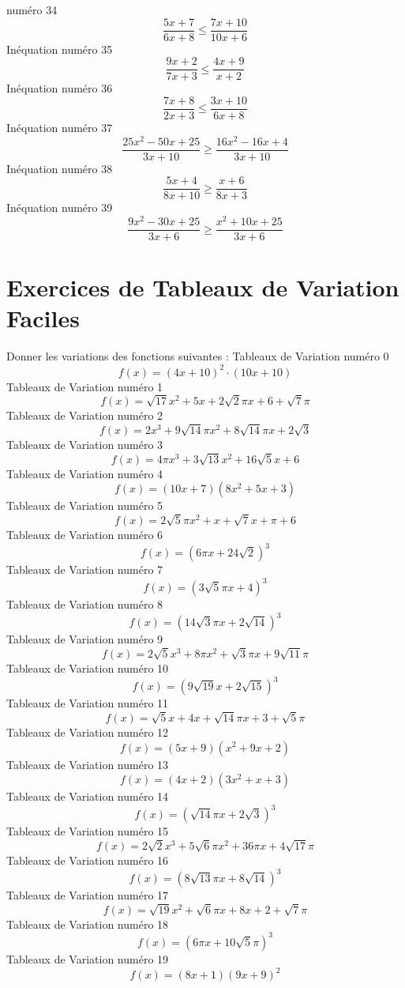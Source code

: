 \documentclass{article}
\begin{document}
num\'ero 34 \[\frac{5 x + 7}{6 x + 8} \leq \frac{7 x + 10}{10 x + 6}\]In\'equation num\'ero 35 \[\frac{9 x + 2}{7 x + 3} \leq \frac{4 x + 9}{x + 2}\]In\'equation num\'ero 36 \[\frac{7 x + 8}{2 x + 3} \leq \frac{3 x + 10}{6 x + 8}\]In\'equation num\'ero 37 \[\frac{25 x^{2} - 50 x + 25}{3 x + 10} \geq \frac{16 x^{2} - 16 x + 4}{3 x + 10}\]In\'equation num\'ero 38 \[\frac{5 x + 4}{8 x + 10} \geq \frac{x + 6}{8 x + 3}\]In\'equation num\'ero 39 \[\frac{9 x^{2} - 30 x + 25}{3 x + 6} \geq \frac{x^{2} + 10 x + 25}{3 x + 6}\]
 \section{Exercices de Tableaux de Variation Faciles}

 Donner les variations des fonctions suivantes : 
Tableaux de Variation num\'ero 0 \[f(x) = \left(4 x + 10\right)^{2} \cdot \left(10 x + 10\right)\]Tableaux de Variation num\'ero 1 \[f(x) = \sqrt{17} x^{2} + 5 x + 2 \sqrt{2} \pi x + 6 + \sqrt{7} \pi\]Tableaux de Variation num\'ero 2 \[f(x) = 2 x^{3} + 9 \sqrt{14} \pi x^{2} + 8 \sqrt{14} \pi x + 2 \sqrt{3}\]Tableaux de Variation num\'ero 3 \[f(x) = 4 \pi x^{3} + 3 \sqrt{13} x^{2} + 16 \sqrt{5} x + 6\]Tableaux de Variation num\'ero 4 \[f(x) = \left(10 x + 7\right) \left(8 x^{2} + 5 x + 3\right)\]Tableaux de Variation num\'ero 5 \[f(x) = 2 \sqrt{5} \pi x^{2} + x + \sqrt{7} x + \pi + 6\]Tableaux de Variation num\'ero 6 \[f(x) = \left(6 \pi x + 24 \sqrt{2}\right)^{3}\]Tableaux de Variation num\'ero 7 \[f(x) = \left(3 \sqrt{5} \pi x + 4\right)^{3}\]Tableaux de Variation num\'ero 8 \[f(x) = \left(14 \sqrt{3} \pi x + 2 \sqrt{14}\right)^{3}\]Tableaux de Variation num\'ero 9 \[f(x) = 2 \sqrt{5} x^{3} + 8 \pi x^{2} + \sqrt{3} \pi x + 9 \sqrt{11} \pi\]Tableaux de Variation num\'ero 10 \[f(x) = \left(9 \sqrt{19} x + 2 \sqrt{15}\right)^{3}\]Tableaux de Variation num\'ero 11 \[f(x) = \sqrt{5} x + 4 x + \sqrt{14} \pi x + 3 + \sqrt{5} \pi\]Tableaux de Variation num\'ero 12 \[f(x) = \left(5 x + 9\right) \left(x^{2} + 9 x + 2\right)\]Tableaux de Variation num\'ero 13 \[f(x) = \left(4 x + 2\right) \left(3 x^{2} + x + 3\right)\]Tableaux de Variation num\'ero 14 \[f(x) = \left(\sqrt{14} \pi x + 2 \sqrt{3}\right)^{3}\]Tableaux de Variation num\'ero 15 \[f(x) = 2 \sqrt{2} x^{3} + 5 \sqrt{6} \pi x^{2} + 36 \pi x + 4 \sqrt{17} \pi\]Tableaux de Variation num\'ero 16 \[f(x) = \left(8 \sqrt{13} \pi x + 8 \sqrt{14}\right)^{3}\]Tableaux de Variation num\'ero 17 \[f(x) = \sqrt{19} x^{2} + \sqrt{6} \pi x + 8 x + 2 + \sqrt{7} \pi\]Tableaux de Variation num\'ero 18 \[f(x) = \left(6 \pi x + 10 \sqrt{5} \pi\right)^{3}\]Tableaux de Variation num\'ero 19 \[f(x) = \left(8 x + 1\right) \left(9 x + 9\right)^{2}\]
\end{document}
